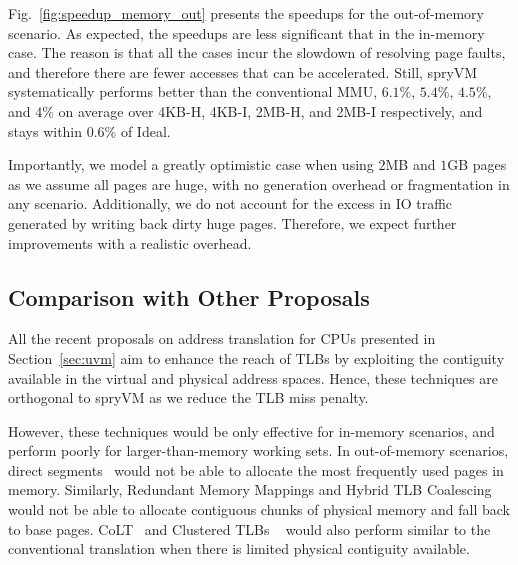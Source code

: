 Fig.~\ref{fig:speedup_memory_out} presents the speedups for the out-of-memory scenario. As expected, the speedups are less significant that in the in-memory case. The reason is that all the cases incur the slowdown of resolving page faults, and therefore there are fewer accesses that can be accelerated. Still, spryVM systematically performs better than the conventional MMU, $6.1\%$, $5.4\%$, $4.5\%$, and $4\%$ on average over 4KB-H, 4KB-I, 2MB-H, and 2MB-I respectively, and stays within 0.6\% of Ideal. 

Importantly, we model a greatly optimistic case when using $2$MB and $1$GB pages as we assume all pages are huge, with no generation overhead or fragmentation in any scenario. Additionally, we do not account for the excess in IO traffic generated by writing back dirty huge pages. Therefore, we expect further improvements with a realistic overhead. 



\subsection{Comparison with Other Proposals}

All the recent proposals on address translation for CPUs presented in Section~\ref{sec:uvm} aim to enhance the reach of TLBs by exploiting the contiguity available in the virtual and physical address spaces. Hence, these techniques are orthogonal to spryVM as we reduce the TLB miss penalty. 

However, these techniques would be only effective for in-memory scenarios, and perform poorly for larger-than-memory working sets. In out-of-memory scenarios, direct segments~\cite{basu:efficient} would not be able to allocate the most frequently used pages in memory. Similarly, Redundant Memory Mappings and Hybrid TLB Coalescing~\cite{karakostas:redundant, park:hybrid} would not be able to allocate contiguous chunks of physical memory and fall back to base pages. CoLT~\cite{pham:colt} and Clustered TLBs ~\cite{pham:increasing} would also perform similar to the conventional translation when there is limited physical contiguity available. 
